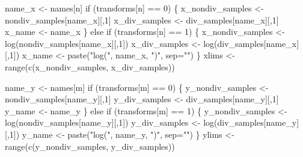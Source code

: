 \documentclass[
  letterpaper,
  DIV=11,
  numbers=noendperiod]{scrartcl}
\newenvironment{Shaded}{\begin{snugshade}}{\end{snugshade}}
\newcommand{\AttributeTok}[1]{\textcolor[rgb]{0.40,0.45,0.13}{#1}}
\newcommand{\ControlFlowTok}[1]{\textcolor[rgb]{0.00,0.23,0.31}{#1}}
\newcommand{\DecValTok}[1]{\textcolor[rgb]{0.68,0.00,0.00}{#1}}
\newcommand{\FunctionTok}[1]{\textcolor[rgb]{0.28,0.35,0.67}{#1}}
\newcommand{\NormalTok}[1]{\textcolor[rgb]{0.00,0.23,0.31}{#1}}
\newcommand{\OtherTok}[1]{\textcolor[rgb]{0.00,0.23,0.31}{#1}}
\newcommand{\SpecialCharTok}[1]{\textcolor[rgb]{0.37,0.37,0.37}{#1}}
\newcommand{\StringTok}[1]{\textcolor[rgb]{0.13,0.47,0.30}{#1}}
\begin{document}
\begin{Shaded}
\begin{Highlighting}[]
\NormalTok{      name\_x }\OtherTok{\textless{}{-}}\NormalTok{ names[n]}
      \ControlFlowTok{if}\NormalTok{ (transforms[n] }\SpecialCharTok{==} \DecValTok{0}\NormalTok{) \{}
\NormalTok{        x\_nondiv\_samples }\OtherTok{\textless{}{-}}\NormalTok{ nondiv\_samples[name\_x][,}\DecValTok{1}\NormalTok{]}
\NormalTok{        x\_div\_samples }\OtherTok{\textless{}{-}}\NormalTok{ div\_samples[name\_x][,}\DecValTok{1}\NormalTok{]}
\NormalTok{        x\_name }\OtherTok{\textless{}{-}}\NormalTok{ name\_x}
\NormalTok{      \} }\ControlFlowTok{else} \ControlFlowTok{if}\NormalTok{ (transforms[n] }\SpecialCharTok{==} \DecValTok{1}\NormalTok{) \{}
\NormalTok{        x\_nondiv\_samples }\OtherTok{\textless{}{-}} \FunctionTok{log}\NormalTok{(nondiv\_samples[name\_x][,}\DecValTok{1}\NormalTok{])}
\NormalTok{        x\_div\_samples }\OtherTok{\textless{}{-}} \FunctionTok{log}\NormalTok{(div\_samples[name\_x][,}\DecValTok{1}\NormalTok{])}
\NormalTok{        x\_name }\OtherTok{\textless{}{-}} \FunctionTok{paste}\NormalTok{(}\StringTok{"log("}\NormalTok{, name\_x, }\StringTok{")"}\NormalTok{, }\AttributeTok{sep=}\StringTok{""}\NormalTok{)}
\NormalTok{      \}}
\NormalTok{      xlims }\OtherTok{\textless{}{-}} \FunctionTok{range}\NormalTok{(}\FunctionTok{c}\NormalTok{(x\_nondiv\_samples, x\_div\_samples))}
    
\NormalTok{      name\_y }\OtherTok{\textless{}{-}}\NormalTok{ names[m]}
      \ControlFlowTok{if}\NormalTok{ (transforms[m] }\SpecialCharTok{==} \DecValTok{0}\NormalTok{) \{}
\NormalTok{        y\_nondiv\_samples }\OtherTok{\textless{}{-}}\NormalTok{ nondiv\_samples[name\_y][,}\DecValTok{1}\NormalTok{]}
\NormalTok{        y\_div\_samples }\OtherTok{\textless{}{-}}\NormalTok{ div\_samples[name\_y][,}\DecValTok{1}\NormalTok{]}
\NormalTok{        y\_name }\OtherTok{\textless{}{-}}\NormalTok{ name\_y}
\NormalTok{      \} }\ControlFlowTok{else} \ControlFlowTok{if}\NormalTok{ (transforms[m] }\SpecialCharTok{==} \DecValTok{1}\NormalTok{) \{}
\NormalTok{        y\_nondiv\_samples }\OtherTok{\textless{}{-}} \FunctionTok{log}\NormalTok{(nondiv\_samples[name\_y][,}\DecValTok{1}\NormalTok{])}
\NormalTok{        y\_div\_samples }\OtherTok{\textless{}{-}} \FunctionTok{log}\NormalTok{(div\_samples[name\_y][,}\DecValTok{1}\NormalTok{])}
\NormalTok{        y\_name }\OtherTok{\textless{}{-}} \FunctionTok{paste}\NormalTok{(}\StringTok{"log("}\NormalTok{, name\_y, }\StringTok{")"}\NormalTok{, }\AttributeTok{sep=}\StringTok{""}\NormalTok{)}
\NormalTok{      \}}
\NormalTok{      ylims }\OtherTok{\textless{}{-}} \FunctionTok{range}\NormalTok{(}\FunctionTok{c}\NormalTok{(y\_nondiv\_samples, y\_div\_samples))}
    

\end{Highlighting}
\end{Shaded}
\end{document}

